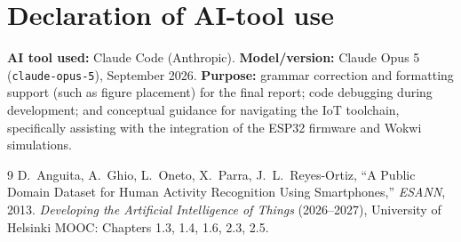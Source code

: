 \documentclass[10pt,a4paper]{article}
\begin{document}
\section*{Declaration of AI-tool use}
\textbf{AI tool used:} Claude Code (Anthropic). \textbf{Model/version:} Claude Opus 5 (\texttt{claude-opus-5}), September 2026. \textbf{Purpose:} grammar correction and formatting support (such as figure placement) for the final report; code debugging during development; and conceptual guidance for navigating the IoT toolchain, specifically assisting with the integration of the ESP32 firmware and Wokwi simulations.

\begin{thebibliography}{9}\small
{} D.~Anguita, A.~Ghio, L.~Oneto, X.~Parra, J.~L.~Reyes-Ortiz, ``A Public Domain Dataset for Human Activity Recognition Using Smartphones,'' \emph{ESANN}, 2013.
 \emph{Developing the Artificial Intelligence of Things} (2026--2027), University of Helsinki MOOC: Chapters 1.3, 1.4, 1.6, 2.3, 2.5.
\end{thebibliography}
\end{document}
